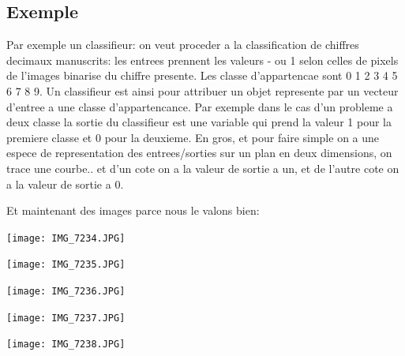 \documentclass[a4paper,12pt]{report}
\begin{document}
\subsection{Exemple}
Par exemple un classifieur: on veut proceder a la classification de
chiffres decimaux manuscrits: les entrees prennent les valeurs - ou 1
selon celles de pixels de l'images binarise du chiffre presente. Les
classe d'appartencae sont {0 1 2 3 4 5 6 7 8 9}.
Un classifieur est ainsi pour attribuer un objet represente par
un vecteur d'entree a une classe d'appartencance. Par exemple dans le
cas d'un probleme a deux classe la sortie du classifieur est une
variable qui prend la valeur 1 pour la premiere classe et 0 pour la
deuxieme.
En gros, et pour faire simple on a une espece de representation des
entrees/sorties sur un plan en deux dimensions, on trace une
courbe.. et d'un cote on a la valeur de sortie a un, et de l'autre
cote on a la valeur de sortie a 0.

Et maintenant des images parce nous le valons bien:

\begin{center}
	
	\texttt{[image: IMG\_7234.JPG]}\\
	\caption{\emph{Neurone Formel \`a potentiel.}}
\end{center}

\begin{center}
	
	\texttt{[image: IMG\_7235.JPG]}\\
	\caption{\emph{Repr\'esentation des entr\'ees sorties.}}
\end{center}

\begin{center}
	
	\texttt{[image: IMG\_7236.JPG]}\\
	\caption{\emph{Mod\`ele neuronal \`a une couche de neurones cach\'e.}}
\end{center}

\begin{center}
	
	\texttt{[image: IMG\_7237.JPG]}\\
	\caption{\emph{Rnfs pour sigmoides, avec un neurones de biais}}
\end{center}

\begin{center}
	
	\texttt{[image: IMG\_7238.JPG]}\\
	\caption{\emph{Un exemple de ce que nous n'avons pas fait}}
\end{center}
\end{document}
